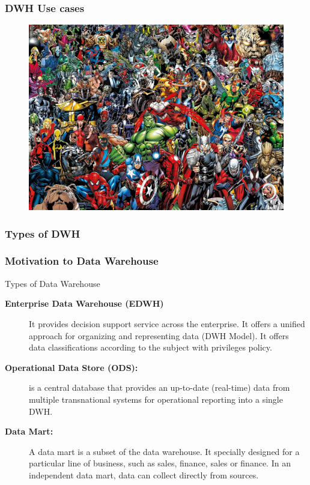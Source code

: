 \begin{frame}
\frametitle{DWH Use cases}
\begin{figure}[ht]

\centering
\includegraphics[width=\linewidth,height=.8\textheight]{./Figures/chapter-01/Marvel-01.jpg}
\end{figure}
\end{frame}


\subsubsection{Types of DWH}
\begin{frame}
\frametitle{Motivation to Data Warehouse}
Types of Data Warehouse
\begin{description}
\item [\textbf{Enterprise Data Warehouse (EDWH)}] It provides decision support service across the enterprise. It offers a unified approach for organizing and representing data (DWH Model). It offers data classifications according to the subject with privileges policy.
\item [\textbf{Operational Data Store (ODS):}] is a central database that provides an up-to-date (real-time) data from multiple transnational systems for operational reporting into a single DWH.

\item [\textbf{Data Mart:}] A data mart is a subset of the data warehouse. It specially designed for a particular line of business, such as sales, finance, sales or finance. In an independent data mart, data can collect directly from sources.
\end{description}

\end{frame}

